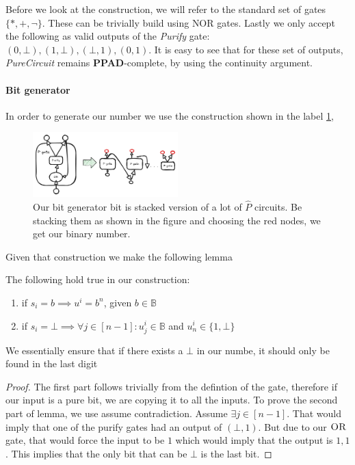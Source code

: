Before we look at the construction, we will refer to the standard set of gates $\{*, + , \neg\}$. These can
be trivially build using $\text{NOR}$ gates. Lastly we only accept the following as valid outputs of
the \textit{Purify} gate: $(0, \bot), (1, \bot), (\bot,1), (0,1)$. It is easy to see that for these set
of outputs, \textit{PureCircuit} remains \textbf{PPAD}-complete, by using the continuity argument.



\paragraph{Bit generator}

In order to generate our number we use the construction shown in the label \ref{fig:main-proof:purification},

\begin{figure}[h!]
    \centering
    \includegraphics[width=0.5\textwidth, clip]{assets/purification_generator.png}
    \caption{Our bit generator bit is stacked version of a lot of $\hat{P}$ circuits. Be stacking them as shown in the figure and choosing the red nodes,
    we get our binary number.}
    \label{fig:main-proof:purification}
\end{figure}
\FloatBarrier

Given that construction we make the following lemma

\begin{lemma}
    \label{lem:bit-gen}
    The following hold true in our construction:
    \begin{enumerate}
        \item if $s_i = b \implies u^i = b^n$, given $b \in \mathbb{B}$
        \item if $s_i = \bot \implies \forall j \in [n-1]: u^i_j \in \mathbb{B}$ and $u^i_{n} \in \{1, \bot\}$
    \end{enumerate}
    We essentially ensure that if there exists a $\bot$ in our numbe, it should only be found in the last digit
\end{lemma}

\begin{proof}
    The first part follows trivially from the defintion of the  gate, therefore if our input is a pure bit,
    we are copying it to all the inputs. To prove the second part of lemma, we use assume contradiction.
    Assume $\exists j \in [n-1]$. That would imply that one of the purify gates had an output of $(\bot, 1)$.
    But due to our $\textsc{OR}$ gate, that would force the input to be $1$ which would imply that the output is $1,1$.
    This implies that the only bit that can be $\bot$ is the last bit.
\end{proof}




